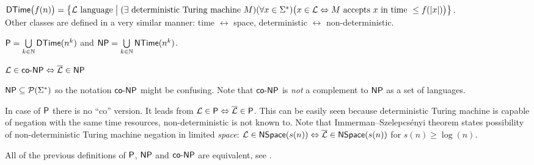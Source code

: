 		\begin{defn}\label{def:DTime}
			$\DTime\bigl(f(n)\bigr) = \bigl\{ {\cal L}\textnormal{ language} \bigm| (\exists \textnormal{ deterministic Turing machine }M)\\ (\forall x\in\Sigma^*)\bigl(x\in{\cal L} \iff M\textnormal{ accepts }x\textnormal{ in time }\leq f(|x|)\bigr) \bigr\}$.\\
			Other classes are defined in a very similar manner: time $\leftrightarrow$ space, deterministic $\leftrightarrow$ non-deterministic.
		\end{defn}
		
		\begin{defn}
			$\P = \bigcup\limits_{k\in\N} \DTime(n^k)$ and $\NP = \bigcup\limits_{k\in\N} \NTime(n^k)$.
		\end{defn}
		
		\begin{defn}
			$ {\cal L} \in \coNP \iff {\cal\overline L} \in \NP $
		\end{defn}
		
		\begin{note}
			$\NP\subseteq\powerset{\Sigma^*}$ so the notation $\coNP$ might be confusing. Note that $\coNP$ is {\em not} a complement to $\NP$ as a set of languages.
		\end{note}
		
		\begin{remark}
			In case of $\P$ there is no ``co'' version. It leads from ${\cal L} \in \P \iff \overline{\cal L} \in \P$. This can be easily seen because deterministic Turing machine is capable of negation with the same time resources, non-deterministic is not known to. Note that Immerman--Szelepcsényi theorem states possibility of non-deterministic Turing machine negation in limited {\em space}: ${\cal L} \in \NSpace(s(n)) \iff \overline{\cal L} \in \NSpace(s(n))$ for $s(n) \geq \log(n)$.   %
		\end{remark}
		
		\begin{thm}
			All of the previous definitions of $\P$, $\NP$ and $\coNP$ are equivalent, see \cite{book_comp}.
		\end{thm}
		
		
